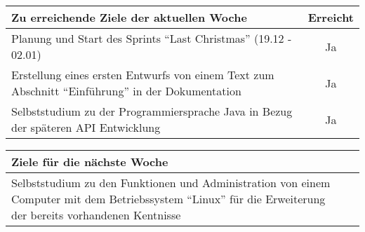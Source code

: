 \begin{tabularx}{\textwidth}{Xc}
    \arrayrulecolor{OliveGreen}
    \toprule
    {\bfseries Zu erreichende Ziele der aktuellen Woche} & {\bfseries Erreicht} \\
    \midrule[2pt]
    Planung und Start des Sprints ``Last Christmas'' (19.12 - 02.01)  &  Ja  \\
    \rowcolor{OliveGreen!15}
    Erstellung eines ersten Entwurfs von einem Text zum Abschnitt ``Einführung''
    in der Dokumentation  &  Ja  \\
    \rowcolor{White}
    Selbststudium zu der Programmiersprache Java in Bezug der späteren API
    Entwicklung  &  Ja  \\
    \bottomrule[2pt]
\end{tabularx}
%
\vspace{1cm}
%
\begin{tabularx}{\textwidth}{Xc}
    \arrayrulecolor{OliveGreen}
    \toprule
    {\bfseries Ziele für die nächste Woche}              &                      \\
    \midrule[2pt]
    Selbststudium zu den Funktionen und Administration von einem Computer
    mit dem Betriebssystem ``Linux'' für die Erweiterung der bereits vorhandenen
    Kentnisse  &  \\
\end{tabularx}
